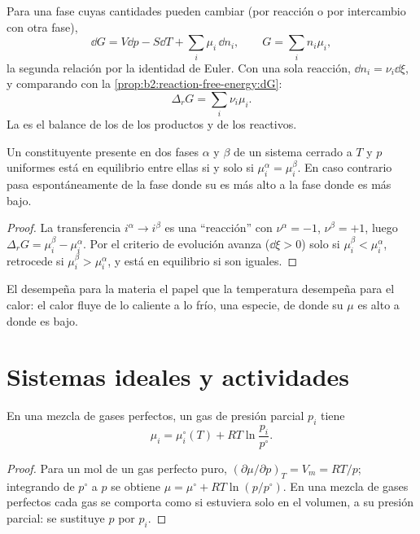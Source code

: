 Para una fase cuyas cantidades pueden cambiar (por reacción o por intercambio con
otra fase),
\[
  \dd G = V\dd p - S\dd T + \sum_i\mu_i\,\dd n_i ,\qquad G = \sum_i n_i\mu_i ,
\]
la segunda relación por la identidad de Euler. Con una sola reacción, $\dd n_i =
\nu_i\dd\xi$, y comparando con la \cref{prop:b2:reaction-free-energy:dG}:
\[
  \Delta_r G = \sum_i\nu_i\mu_i .
\]
La  es el balance de los  de los
productos y de los reactivos.

\begin{theorem}\label{thm:b2:chemical-potential:phase-equilibrium}
Un constituyente presente en dos fases $\alpha$ y $\beta$ de un sistema cerrado a
$T$ y $p$ uniformes está en equilibrio entre ellas si y solo si
$\mu_i^\alpha = \mu_i^\beta$. En caso contrario pasa espontáneamente de la
fase donde su  es más alto a la fase donde es más bajo.
\end{theorem}

\begin{proof}
La transferencia $i^\alpha \to i^\beta$ es una ``reacción'' con $\nu^\alpha = -1$,
$\nu^\beta = +1$, luego $\Delta_r G = \mu_i^\beta - \mu_i^\alpha$. Por el
criterio de evolución avanza ($\dd\xi > 0$) solo si $\mu_i^\beta <
\mu_i^\alpha$, retrocede si $\mu_i^\beta > \mu_i^\alpha$, y está en
equilibrio si son iguales.
\end{proof}

El  desempeña para la materia el papel que la temperatura desempeña
para el calor: el calor fluye de lo caliente a lo frío, una especie, de donde su $\mu$ es alto a donde es bajo.

\section{Sistemas ideales y actividades}

\begin{proposition}\label{prop:b2:chemical-potential:mu-gas}
En una mezcla de gases perfectos, un gas de presión parcial $p_i$ tiene
\[
  \mu_i = \mu_i^\circ(T) + RT\ln\frac{p_i}{p^\circ} .
\]
\end{proposition}

\begin{proof}
Para un mol de un gas perfecto puro, $(\partial\mu/\partial p)_T = V_m =
RT/p$; integrando de $p^\circ$ a $p$ se obtiene $\mu = \mu^\circ + RT\ln(p/p^\circ)$.
En una mezcla de gases perfectos cada gas se comporta como si estuviera solo en el volumen, a
su presión parcial: se sustituye $p$ por $p_i$.
\end{proof}

